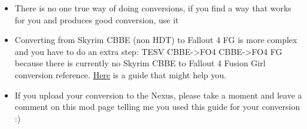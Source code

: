 \begin{itemize}
    \item There is no one true way of doing conversions, if you find a way that works for you and produces good conversion, use it
    \item Converting from Skyrim CBBE (non HDT) to Fallout 4 FG is more complex and you have to do an extra step: TESV CBBE->FO4 CBBE->FO4 FG 
    because there is currently no Skyrim CBBE to Fallout 4 Fusion Girl conversion reference. \href{https://www.nexusmods.com/fallout4/mods/21111}{Here} 
    is a guide that might help you.
    \item If you upload your conversion to the Nexus, please take a moment and leave a comment on this mod page telling me you used this guide for your conversion :)
\end{itemize}